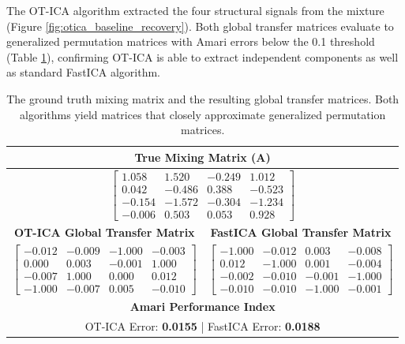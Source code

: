 \documentclass[12pt,a4paper,twoside,openany]{book}
\begin{document}
The OT-ICA algorithm extracted the four structural signals from the mixture (Figure \ref{fig:otica_baseline_recovery}). 
Both global transfer matrices evaluate to generalized permutation matrices with Amari errors below the 0.1 threshold (Table \ref{tab:baseline_matrices}), 
confirming OT-ICA is able to extract independent components as well as standard FastICA algorithm.


\begin{table}[tbp]
    \centering
    \small
    \begin{tabular}{cc}
        \toprule
        \multicolumn{2}{c}{\textbf{True Mixing Matrix ($\mathbf{A}$)}} \\
        \midrule
        \multicolumn{2}{c}{$
        \begin{bmatrix}
         1.058 &  1.520 & -0.249 &  1.012 \\
         0.042 & -0.486 &  0.388 & -0.523 \\
        -0.154 & -1.572 & -0.304 & -1.234 \\
        -0.006 &  0.503 &  0.053 &  0.928 
        \end{bmatrix}
        $} \\
        \midrule
        \textbf{OT-ICA Global Transfer Matrix} & \textbf{FastICA Global Transfer Matrix} \\
        \midrule
        $
        \begin{bmatrix}
        -0.012 & -0.009 & -1.000 & -0.003 \\
         0.000 &  0.003 & -0.001 &  1.000 \\
        -0.007 &  1.000 &  0.000 &  0.012 \\
        -1.000 & -0.007 &  0.005 & -0.010 
        \end{bmatrix}
        $ 
        & 
        $
        \begin{bmatrix}
        -1.000 & -0.012 &  0.003 & -0.008 \\
         0.012 & -1.000 &  0.001 & -0.004 \\
        -0.002 & -0.010 & -0.001 & -1.000 \\
        -0.010 & -0.010 & -1.000 & -0.001 
        \end{bmatrix}
        $ \\
        \midrule
        \multicolumn{2}{c}{\textbf{Amari Performance Index}} \\
        \midrule
        \multicolumn{2}{c}{OT-ICA Error: \textbf{0.0155} \quad | \quad FastICA Error: \textbf{0.0188}} \\
        \bottomrule
    \end{tabular}
    \caption[Baseline Matrices and Amari Error]{The ground truth mixing matrix and the resulting global transfer matrices. 
    Both algorithms yield matrices that closely approximate generalized permutation matrices.}
    \label{tab:baseline_matrices}
\end{table}
\end{document}
